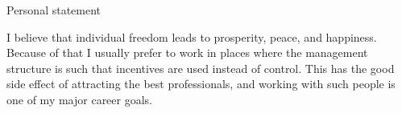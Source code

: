 \begin{rubric}{Personal statement}{

    \entry*

    I believe that individual freedom leads to prosperity, peace, and
happiness. Because of that I usually prefer to work in places where
the management structure is such that incentives are used instead of
control. This has the good side effect of attracting the best professionals, and working with such people is one of my major career goals.

}
\end{rubric}
